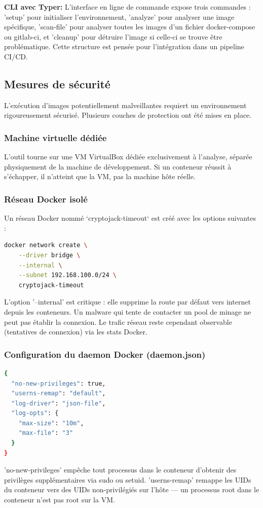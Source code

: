 \textbf{CLI avec Typer:}
L'interface en ligne de commande expose trois commandes : 'setup' pour initialiser l'environnement, 'analyze' pour analyser une image spécifique, 'scan-file' pour analyser toutes les images d'un fichier docker-compose ou gitlab-ci, et 'cleanup' pour détruire l'image si celle-ci se trouve être problématique. Cette structure est pensée pour l'intégration dans un pipeline CI/CD.
\subsection{Mesures de sécurité}
L'exécution d'images potentiellement malveillantes requiert un environnement rigoureusement sécurisé. Plusieurs couches de protection ont été mises en place. \\
\subsubsection{Machine virtuelle dédiée}
L'outil tourne sur une VM VirtualBox dédiée exclusivement à l'analyse, séparée physiquement de la machine de développement. Si un conteneur réussit à s'échapper, il n'atteint que la VM, pas la machine hôte réelle.
\subsubsection{Réseau Docker isolé}
Un réseau Docker nommé `cryptojack-timeout` est créé avec les options suivantes :
\begin{lstlisting}[language=bash, caption=création du réseau isolé]
docker network create \
    --driver bridge \
    --internal \
    --subnet 192.168.100.0/24 \
    cryptojack-timeout

\end{lstlisting}
L'option '--internal' est critique : elle supprime la route par défaut vers internet depuis les conteneurs. Un malware qui tente de contacter un pool de minage ne peut pas établir la connexion. Le trafic réseau reste cependant observable (tentatives de connexion) via les stats Docker.
\subsubsection{Configuration du daemon Docker (daemon.json)}
\begin{lstlisting}[language=bash, caption=fichier daemon.json]
{
  "no-new-privileges": true,
  "userns-remap": "default",
  "log-driver": "json-file",
  "log-opts": {
    "max-size": "10m",
    "max-file": "3"
  }
}
\end{lstlisting}
'no-new-privileges' empêche tout processus dans le conteneur d'obtenir des privilèges supplémentaires via sudo ou setuid. 'userns-remap' remappe les UIDs du conteneur vers des UIDs non-privilégiés sur l'hôte — un processus root dans le conteneur n'est pas root sur la VM.
